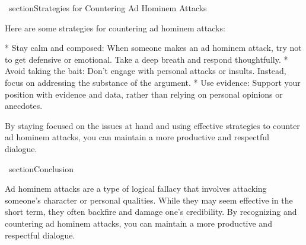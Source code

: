 \ section{Strategies for Countering Ad Hominem Attacks}

 Here are some strategies for countering ad hominem attacks:

*   Stay calm and composed: When someone makes an ad hominem attack, try not to get defensive or emotional. Take a deep breath and respond thoughtfully.
*   Avoid taking the bait: Don't engage with personal attacks or insults. Instead, focus on addressing the substance of the argument.
*   Use evidence: Support your position with evidence and data, rather than relying on personal opinions or anecdotes.

 By staying focused on the issues at hand and using effective strategies to counter ad hominem attacks, you can maintain a more productive and respectful dialogue.

\ section{Conclusion}

 Ad hominem attacks are a type of logical fallacy that involves attacking someone's character or personal qualities. While they may seem effective in the short term, they often backfire and damage one's credibility. By recognizing and countering ad hominem attacks, you can maintain a more productive and respectful dialogue.
